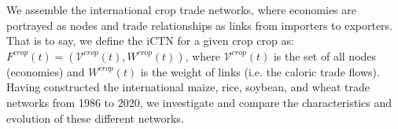 \documentclass[preprint,3p,times,sort&compress]{elsarticle}
\begin{document}
We assemble the international crop trade networks, where economies are portrayed as nodes and trade relationships as links from importers to exporters. That is to say, we define the iCTN for a given crop $\mathrm{crop}$ as: $F^{crop}(t) = \left(\mathscr{V}^{crop}(t), W^{crop}(t) \right)$, where ${\mathscr{V}}^{crop}(t)$ is the set of all nodes (economies) and $W^{crop}(t)$ is the weight of links (i.e. the caloric trade flows). Having constructed the international maize, rice, soybean, and wheat trade networks from 1986 to 2020, we investigate and compare the characteristics and evolution of these different networks.








\end{document}

